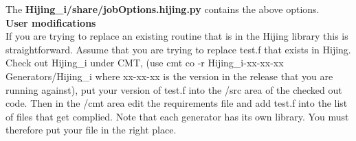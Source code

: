 \documentclass[11pt]{article}
\begin{document}
 The {\bf Hijing\_i/share/jobOptions.hijing.py } contains the above options.\\

{\large \bf User modifications}\\

If you are trying to replace an existing routine that is in the Hijing library this is straightforward.
Assume that you are trying to replace test.f that exists in Hijing.
Check out Hijing\_i under CMT,  (use cmt co -r Hijing\_i-xx-xx-xx  Generators/Hijing\_i where
xx-xx-xx is the version in the release that you are running against), put your version of test.f
into the /src area of the checked out code. Then in the /cmt area edit the requirements file and add test.f
into the list of files that get complied. Note that each generator has its own library. You must therefore put
your file in the right place. \\
\end{document}
